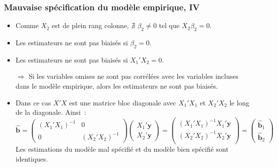 \documentclass[10pt]{beamer}
\theoremstyle{plain}
\begin{document}
\begin{frame}
  \frametitle{Mauvaise spécification du modèle empirique, IV}

  \begin{itemize}

  \item Comme $X_2$ est de plein rang colonne, $\nexists$ $\beta_2\neq 0$ tel que $X_2\beta_2=0$.\newline

  \item Les estimateurs ne sont pas biaisés si $\beta_2=0$.\newline

  \item Les estimateurs ne sont pas biaisés si $X_1'X_2 = 0$.\newline

  \item[$\Rightarrow$] Si les variables omises ne sont pas corrélées avec les variables incluses dans le modèle empirique, alors les estimateurs ne sont pas biaisés.\newline

  \item Dans ce cas $X'X$ est une matrice bloc diagonale avec $X_1'X_1$ et $X_2'X_2$ le long de la diagonale. Ainsi~:
    \[
      \hat{\mathbf b} =
      \begin{pmatrix}
        (X_1'X_1)^{-1} & 0 \\
        0 & (X_2'X_2)^{-1}
      \end{pmatrix}
      \begin{pmatrix}
        X_1'\mathbf y\\
        X_2'\mathbf y
      \end{pmatrix}
      =
      \begin{pmatrix}
        (X_1'X_1)^{-1}X_1'\mathbf y\\
        (X_2'X_2)^{-1}X_2'\mathbf y\\
      \end{pmatrix}
      =
      \begin{pmatrix}
        \hat{\mathbf b}_1\\
        \hat{\mathbf b}_2
      \end{pmatrix}
    \]
    Les estimations du modèle mal spécifié et du modèle bien spécifié sont identiques.
  \end{itemize}

\end{frame}
\end{document}
